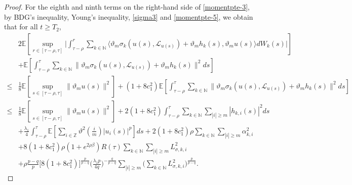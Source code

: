 \documentclass[11pt]{article}
\numberwithin{equation}{section}
\theoremstyle{plain}
\begin{document}
\begin{proof}
 For the eighth and ninth terms on the right-hand side of \eqref{momentpte-3},
 by BDG's inequality, Young's inequality, \eqref{sigma3} and \eqref{momentpte-5},
 we obtain that for all $t \ge T_2$,
 \begin{align}\label{momentpte-10}
        & 2 \mathbb{E}
               \left[ \sup_{r \in [\tau-\rho,\tau]}
                         \Big| \int_{\tau-\rho}^{r} \sum_{k \in \mathbb{N} }
                                     \langle \vartheta_m \sigma_k(u(s),\mathcal{L}_{u(s)}) + \vartheta_m h_k(s),
                                             \vartheta_m u(s)
                                     \rangle dW_k(s)
                         \Big|
                 \right]  \nonumber\\
        & + \mathbb{E}
               \left[ \int_{\tau-\rho}^{\tau}
                         \sum_{k \in \mathbb{N} }
                            \|\vartheta_m \sigma_k(u(s),\mathcal{L}_{u(s)})
                               + \vartheta_m h_k(s) \|^2 ds
               \right]  \nonumber\\
  \le & \frac{1}{8} \mathbb{E}
            \left[ \sup_{s \in [\tau-\rho,\tau]} \|\vartheta_m u(s)\|^2 \right]
         + (1 + 8c_1^2)
           \mathbb{E}
              \left[ \int_{\tau-\rho}^{\tau}
                        \sum_{k \in \mathbb{N} }
                           \| \vartheta_m \sigma_k(u(s),\mathcal{L}_{u(s)})
                               + \vartheta_m h_k(s) \|^2 ds
              \right]  \nonumber\\
  \le & \frac{1}{8} \mathbb{E}
            \left[ \sup_{s \in [\tau-\rho,\tau]} \|\vartheta_m u(s)\|^2 \right]
         + 2(1 + 8c_1^2) \int_{\tau-\rho}^{\tau}
                            \sum_{k \in \mathbb{N} }
                               \sum_{|i| \ge m} |h_{k,i}(s)|^2 ds  \nonumber\\
       & + \frac{\lambda_1}{4} \int_{\tau-\rho}^{\tau}
                                  \mathbb{E}
                                     \left[ \sum_{i \in \mathbb{Z}}
                                                 {\vartheta}^2(\frac{i}{m}) |u_i(s)|^p
                                     \right] ds
         + 2(1 + 8c_1^2) \rho \sum_{k \in \mathbb{N} } \sum_{|i| \ge m} \alpha_{k,i}^2  \nonumber\\
       & + 8(1 + 8c_1^2) \rho (1 + e^{2\rho\beta}) R(\tau)
           \sum_{k \in \mathbb{N} }
              \sum_{|i| \ge m} L_{\sigma,k,i}^2  \nonumber\\
       & + \rho \frac{p-q}{p} 
              \Big[ 8(1 + 8c_1^2) \Big]^{ \frac{p}{p-q} }
              \Big( \frac{\lambda_1 p}{4q} \Big)^{-\frac{q}{p-q} }
                   \sum_{|i| \ge m} 
                         \Big( \sum_{k \in \mathbb{N} } L^2_{\sigma,k,i} 
                         \Big)^{ \frac{p}{p-q} }.
 \end{align}


\end{proof}
\end{document}
